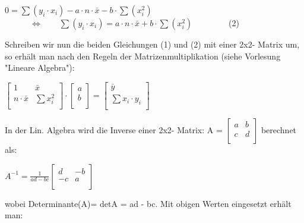 \documentclass[12pt]{article}
\begin{document}
\begin{center}
$ 0 = \sum(y_i \cdot x_i) - a \cdot n \cdot \bar{x} - b \cdot \sum(x_i^2) $ \\[0.4cm]  
$ \quad\quad\quad \Leftrightarrow \qquad \sum(y_i \cdot x_i) =  a \cdot n \cdot \bar{x} + b \cdot \sum(x_i^2)\qquad\qquad  $ (2) \\[0.3cm]
\end{center}
%
Schreiben wir nun die beiden Gleichungen (1) und (2) mit einer 2x2- Matrix um, so erhält man nach den Regeln der Matrizenmultiplikation (siehe Vorlesung "Lineare Algebra"):\\[0.2cm]  
\begin{center}
\begin{large} 
$ \begin{bmatrix} 1 & \bar{x} \\ n \cdot \bar{x} & \sum{x_i^2} \\ \end{bmatrix} \cdot                                                                                                  \begin{bmatrix} a \\ b \\ \end{bmatrix} = \begin{bmatrix} \bar{y} \\ \sum{x_i \cdot y_i}  \\ \end{bmatrix} $
\end{large}
\end{center}
%
In der Lin. Algebra wird die Inverse einer 2x2- Matrix:    
A = $ \begin{bmatrix} a & b \\ c & d \\ \end{bmatrix} $ berechnet als: 
\begin{center}
\begin{large} 
$ A^{-1} = \frac{1}{ad - bc} \begin{bmatrix}
d & -b \\
-c & a \\
\end{bmatrix} $
\end{large}
\end{center} 
wobei Determinante(A)= detA = ad - bc. Mit obigen Werten eingesetzt erhält man: \\
\end{document}
